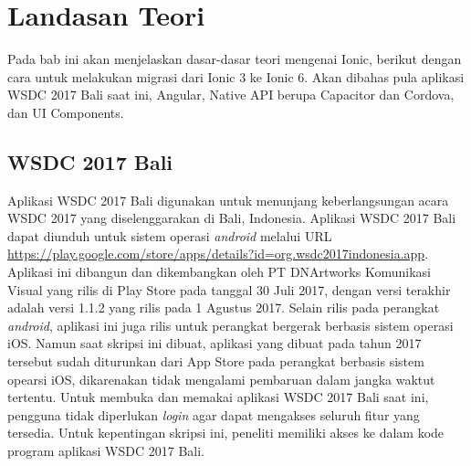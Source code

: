 \setcounter{secnumdepth}{4}
\chapter{Landasan Teori}
\label{chap:teori}

Pada bab ini akan menjelaskan dasar-dasar teori mengenai Ionic, berikut dengan cara untuk melakukan migrasi dari Ionic 3 ke Ionic 6. Akan dibahas pula aplikasi WSDC 2017 Bali saat ini, Angular, Native API berupa Capacitor dan Cordova, dan UI Components.

\section{WSDC 2017 Bali}
\label{sec:wsdc2017bali}

Aplikasi WSDC 2017 Bali digunakan untuk menunjang keberlangsungan acara WSDC 2017 yang diselenggarakan di Bali, Indonesia. Aplikasi WSDC 2017 Bali dapat diunduh untuk sistem operasi {\it android} melalui URL \url{https://play.google.com/store/apps/details?id=org.wsdc2017indonesia.app}. Aplikasi ini dibangun dan dikembangkan oleh PT DNArtworks Komunikasi Visual yang rilis di Play Store pada tanggal 30 Juli 2017, dengan versi terakhir adalah versi 1.1.2 yang rilis pada 1 Agustus 2017. Selain rilis pada perangkat {\it android}, aplikasi ini juga rilis untuk perangkat bergerak berbasis sistem operasi iOS. Namun saat skripsi ini dibuat, aplikasi yang dibuat pada tahun 2017 tersebut sudah diturunkan dari App Store pada perangkat berbasis sistem opearsi iOS, dikarenakan tidak mengalami pembaruan dalam jangka waktut tertentu. Untuk membuka dan memakai aplikasi WSDC 2017 Bali saat ini, pengguna tidak diperlukan {\it login} agar dapat mengakses seluruh fitur yang tersedia. Untuk kepentingan skripsi ini, peneliti memiliki akses ke dalam kode program aplikasi WSDC 2017 Bali.

